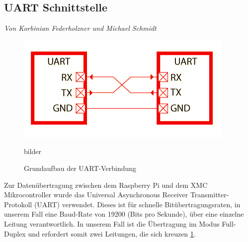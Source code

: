 \documentclass[12pt,a4paper,bibliography=totoc,listof=totoc]{scrartcl}
\begin{document}
\subsection{UART Schnittstelle}
\textit{Von Korbinian Federholzner und Michael Schmidt}\newline
\begin{figure}[htbp]
	\centering
	\includegraphics[scale = 0.44]{pics/BildUart1}
	\caption{Grundaufbau der UART-Verbindung}bilder 
	\label{UART}
\end{figure}
Zur Datenübertragung zwischen dem Raspberry Pi und dem XMC Mikrocontroller wurde das Universal 
Asynchronous Receiver Transmitter-Protokoll (UART) verwendet. Dieses ist für schnelle Bitübertragungsraten, 
in unserem Fall eine Baud-Rate von 19200 (Bits pro Sekunde), über eine einzelne Leitung verantwortlich. 
In unserem Fall ist die Übertragung im Modus Full-Duplex und erfordert somit zwei Leitungen, die sich 
kreuzen \ref{UART}.
\end{document}
